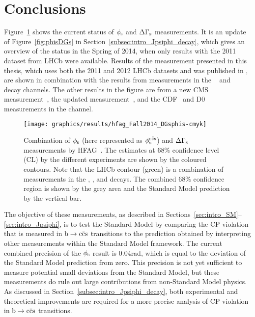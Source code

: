 \chapter*{Conclusions}
\chaptermark{}

Figure~\ref{fig:phisDGsNew} shows the current status of $\phi_\text{s}$ and $\Delta\Gamma_\text{s}$ measurements. It is an update of Figure~\ref{fig:phisDGs} in
Section~\ref{subsec:intro_Jpsiphi_decay}, which gives an overview of the status in the Spring of 2014, when only results with the 2011
dataset from LHCb were available. Results of the measurement presented in this thesis, which uses both the 2011 and 2012 LHCb datasets and
was published in \cite{LHCb-PAPER-2014-059}, are shown in combination with the results from measurements in the
\BstoJpsipipi~\cite{LHCb-PAPER-2014-019} and \BstoDspDsm~\cite{LHCb-PAPER-2014-051} decay channels. The other results in the figure are
from a new CMS measurement~\cite{CMS:2014jxa}, the updated \atlas{} measurement~\cite{Aad:2014cqa}, and the CDF~\cite{Aaltonen:2012ie} and
D0~\cite{Abazov:2011ry} measurements in the \BstoJpsiphi{} channel.
\begin{figure}[htb]
  \centering
  \texttt{[image: graphics/results/hfag\_Fall2014\_DGsphis-cmyk]}
  \caption{Combination of $\phi_\text{s}$ (here represented as $\phisccs$) and $\Delta\Gamma_\text{s}$ measurements by HFAG~\cite{Amhis:2012bh}.
           The estimates at 68\% confidence level (CL) by the different experiments are shown by the coloured contours.
           Note that the LHCb contour (green) is a combination of measurements in the
           \BstoJpsiphi{}, \BstoJpsipipi{}, and \BstoDspDsm{} decays.
           The combined 68\% confidence region is shown by the grey area and the Standard Model prediction by the vertical bar.}
  \label{fig:phisDGsNew}
\end{figure}

The objective of these measurements, as described in Sections~\ref{sec:intro_SM}--\ref{sec:intro_Jpsiphi}, is to test the Standard Model by
comparing the CP violation that is measured in $\btoccs$ transitions to the prediction obtained by interpreting other measurements within
the Standard Model framework. The current combined precision of the $\phi_\text{s}$ result is 0.04\unitsp{}rad, which is equal to the deviation of
the Standard Model prediction from zero. This precision is not yet sufficient to measure potential small deviations from the Standard
Model, but these measurements do rule out large contributions from non-Standard Model physics. As discussed in
Section~\ref{subsec:intro_Jpsiphi_decay}, both experimental and theoretical improvements are required for a more precise analysis of CP
violation in $\btoccs$ transitions.

